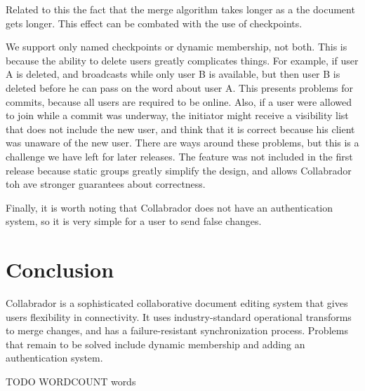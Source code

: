 \documentclass[11pt,titlepage]{article}
\begin{document}
Related to this the fact that the merge algorithm takes longer as a
the document gets longer. This effect can be combated with the use of
checkpoints.

We support only named checkpoints or dynamic membership, not
both. This is because the ability to delete users greatly complicates
things. For example, if user A is deleted, and broadcasts while only
user B is available, but then user B is deleted before he can pass on
the word about user A. This presents problems for commits, because all
users are required to be online.  Also, if a user were allowed to join
while a commit was underway, the initiator might receive a visibility
list that does not include the new user, and think that it is correct
because his client was unaware of the new user.  There are ways around
these problems, but this is a challenge we have left for later
releases. The feature was not included in the first release because
static groups greatly simplify the design, and allows Collabrador toh
ave stronger guarantees about correctness.

Finally, it is worth noting that Collabrador does not have an
authentication system, so it is very simple for a user to send false
changes.

\section{Conclusion}

Collabrador is a sophisticated collaborative document editing system
that gives users flexibility in connectivity. It uses
industry-standard operational transforms to merge changes, and has a
failure-resistant synchronization process.  Problems that remain to be
solved include dynamic membership and adding an authentication system.

 

TODO WORDCOUNT words
\end{document}
